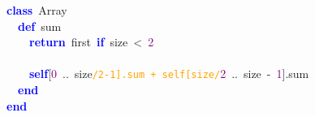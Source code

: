 \noindent
\mbox{}\textbf{\textcolor{Blue}{class}}\ Array \\
\mbox{}\ \ \textbf{\textcolor{Blue}{def}}\ sum \\
\mbox{}\ \ \ \ \textbf{\textcolor{Blue}{return}}\ first\ \textbf{\textcolor{Blue}{if}}\ size\ \textcolor{BrickRed}{\textless{}}\ \textcolor{Purple}{2} \\
\mbox{} \\
\mbox{}\ \ \ \ \textbf{\textcolor{Blue}{self}}\textcolor{BrickRed}{[}\textcolor{Purple}{0}\ \textcolor{BrickRed}{..}\ size\texttt{\textcolor{Orange}{/2-1].sum\ +\ self[size/}}\textcolor{Purple}{2}\ \textcolor{BrickRed}{..}\ size\ \textcolor{BrickRed}{-}\ \textcolor{Purple}{1}\textcolor{BrickRed}{].}sum \\
\mbox{}\ \ \textbf{\textcolor{Blue}{end}} \\
\mbox{}\textbf{\textcolor{Blue}{end}} \\
\mbox{}
